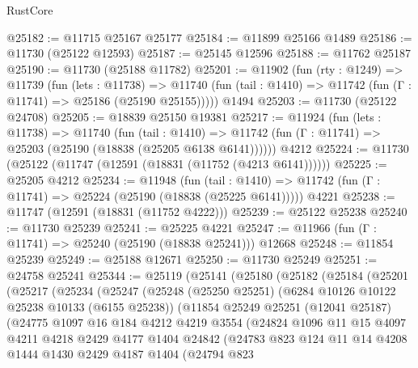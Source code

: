 \begin{lexlean}{RustCore}
\begin{coremodule}
@25182 := @11715 @25167 @25177
@25184 := @11899 @25166 @1489
@25186 := @11730 (@25122 @12593)
@25187 := @25145 @12596
@25188 := @11762 @25187
@25190 := @11730 (@25188 @11782)
@25201 := @11902
    (fun (rty : @1249) =>
    @11739
      (fun (lets : @11738) =>
      @11740 (fun (tail : @1410) => @11742 (fun (Γ : @11741) => @25186 (@25190 @25155)))))
    @1494
@25203 := @11730 (@25122 @24708)
@25205 := @18839 @25150 @19381
@25217 := @11924
    (fun (lets : @11738) =>
    @11740
      (fun (tail : @1410) =>
      @11742 (fun (Γ : @11741) => @25203 (@25190 (@18838 (@25205 @6138 @6141))))))
    @4212
@25224 := @11730 (@25122 (@11747 (@12591 (@18831 (@11752 (@4213 @6141))))))
@25225 := @25205 @4212
@25234 := @11948
    (fun (tail : @1410) => @11742 (fun (Γ : @11741) => @25224 (@25190 (@18838 (@25225 @6141)))))
    @4221
@25238 := @11747 (@12591 (@18831 (@11752 @4222)))
@25239 := @25122 @25238
@25240 := @11730 @25239
@25241 := @25225 @4221
@25247 := @11966 (fun (Γ : @11741) => @25240 (@25190 (@18838 @25241))) @12668
@25248 := @11854 @25239
@25249 := @25188 @12671
@25250 := @11730 @25249
@25251 := @24758 @25241
@25344 := @25119
    (@25141
      (@25180
        (@25182
          (@25184
            (@25201
              (@25217
                (@25234
                  (@25247
                    (@25248
                      (@25250 @25251)
                      (@6284 @10126 @10122 @25238 @10133 (@6155 @25238))
                      (@11854
                        @25249
                        @25251
                        (@12041 @25187)
                        (@24775
                          @1097
                          @16
                          @184
                          @4212
                          @4219
                          @3554
                          (@24824
                            @1096
                            @11
                            @15
                            @4097
                            @4211
                            @4218
                            @2429
                            @4177
                            @1404
                            @24842
                            (@24783
                              @823
                              @124
                              @11
                              @14
                              @4208
                              @1444
                              @1430
                              @2429
                              @4187
                              @1404
                              (@24794
                                @823

\end{coremodule}
\end{lexlean}
